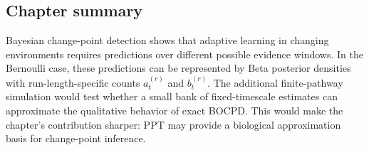 \subsection{Chapter summary}
\label{sec:cpd-b-summary}

Bayesian change-point detection shows that adaptive learning in changing environments requires predictions over different possible evidence windows. In the Bernoulli case, these predictions can be represented by Beta posterior densities with run-length-specific counts \(a_t^{(r)}\) and \(b_t^{(r)}\). The additional finite-pathway simulation would test whether a small bank of fixed-timescale estimates can approximate the qualitative behavior of exact BOCPD. This would make the chapter's contribution sharper: PPT may provide a biological approximation basis for change-point inference.
